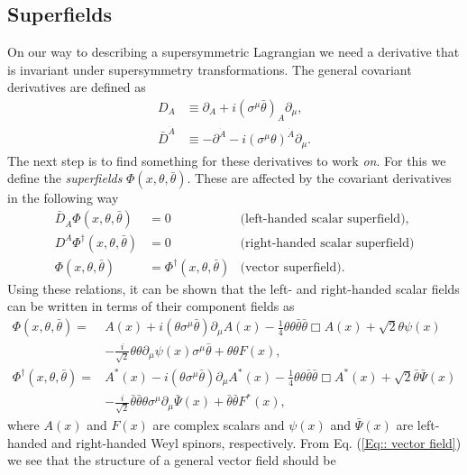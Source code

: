\documentclass[twoside,english]{uiofysmaster}
\begin{document}
\subsection{Superfields}

On our way to describing a supersymmetric Lagrangian we need a derivative that is invariant under supersymmetry transformations. The general covariant derivatives are defined as
\begin{align}
D_A & \equiv \partial_A + i (\sigma^{\mu} \bar{\theta})_A \partial_{\mu},\\
\bar{D}^{\dot{A}} & \equiv -\partial^{\dot{A}} - i (\sigma^{\mu} \theta)^{\dot{A}} \partial_{\mu}.
\end{align}
The next step is to find something for these derivatives to work \textit{on}. For this we define the \textit{superfields} $\Phi(x, \theta, \bar{\theta})$. These are affected by the covariant derivatives in the following way
\begin{align}
\bar{D}_{\dot{A}} \Phi (x, \theta, \bar{\theta}) &= 0 &\text{(left-handed scalar superfield)},\\
D^A \Phi^{\dagger} (x, \theta, \bar{\theta}) &= 0 &\text{(right-handed scalar superfield)}\\
\Phi (x, \theta, \bar{\theta}) &= \Phi^{\dagger} (x, \theta, \bar{\theta}) &\text{(vector superfield)}.\label{Eq:: vector field}
\end{align}
Using these relations, it can be shown that the left- and right-handed scalar fields can be written in terms of their component fields as  \cite{batzing2017lecture}
\begin{align}
\Phi (x, \theta, \bar{\theta}) =& A(x) + i (\theta \sigma^{\mu} \bar{\theta}) \partial_{\mu} A(x) - \frac{1}{4} \theta \theta \bar{\theta} \bar{\theta} \Box A(x) + \sqrt{2} \theta \psi (x)\\
& - \frac{i}{\sqrt{2}} \theta \theta \partial_{\mu} \psi (x) \sigma^{\mu} \bar{\theta} + \theta \theta F(x),\\
\Phi^{\dagger} (x, \theta, \bar{\theta}) =& A^*(x) - i (\theta \sigma^{\mu} \bar{\theta}) \partial_{\mu} A^*(x) - \frac{1}{4} \theta \theta \bar{\theta} \bar{\theta} \Box A^*(x) + \sqrt{2} \bar{\theta} \bar{\Psi} (x)\\
& - \frac{i}{\sqrt{2}} \bar{\theta} \bar{\theta} \theta \sigma^{\mu} \partial_{\mu} \bar{\Psi} (x)  + \bar{\theta} \bar{\theta} F^*(x),
\end{align}
where $A(x)$ and $F(x)$ are complex scalars and $\psi(x)$ and $\bar{\Psi} (x)$ are left-handed and right-handed Weyl spinors, respectively. From Eq. (\ref{Eq:: vector field}) we see that the structure of a general vector field should be  \cite{batzing2017lecture}
\end{document}
